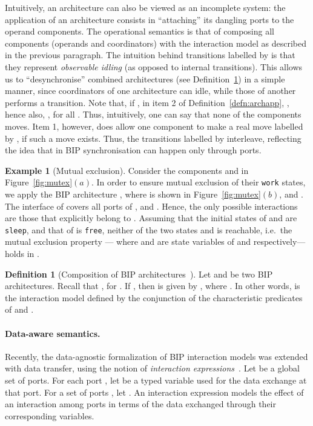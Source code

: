 \documentclass[submission,copyright,creativecommons,hidelinks]{eptcs}
\theoremstyle{plain} \newtheorem{theorem}{Theorem}
\theoremstyle{definition}
\newtheorem{definition}{Definition}
\newtheorem{example}{Example}
\theoremstyle{remark}
\newcommand\xqed[1]{\leavevmode\unskip\penalty9999 \hbox{}\nobreak\hfill
  \quad\hbox{#1}}
\newcommand\tri{\xqed{}}
\newcommand{\mdash}[1][]{---#1}
\newcommand{\ie}[1][\ ]{i.e.{#1}}
\newcommand{\defn}[1]{Definition~\ref{defn:#1}}
\newcommand{\fig}[2][]{Figure~\ref{fig:#2}\ensuremath{#1}}
\begin{document}
Intuitively, an architecture can also be viewed as an incomplete
system: the application of an architecture consists in ``attaching''
its dangling ports to the operand components.  The operational
semantics is that of composing all components (operands and
coordinators) with the interaction model as described in the previous
paragraph.  The intuition behind transitions labelled by 
is that they represent {\em observable idling} (as opposed to internal
transitions).  This allows us to ``desynchronise'' combined
architectures (see \defn{archcomp}) in a simple manner, since
coordinators of one architecture can idle, while those of another 
performs a transition.  Note that, if , in item 2
of \defn{archapp}, , hence also, , for all
.  Thus, intuitively, one can say that none of the components
moves.  Item 1, however, does allow one component to make a real move
labelled by , if such a move exists.  Thus, the transitions
labelled by  interleave, reflecting the idea that in BIP
synchronisation can happen only through ports.

\begin{example}[Mutual exclusion\cite{ABBJS14}]
  \label{ex:mutex:base}
  Consider the components  and  in \fig[(a)]{mutex}.  In order to
  ensure mutual exclusion of their \texttt{work} states, we apply the
  BIP architecture , where 
  is shown in \fig[(b)]{mutex},  and .  
  The interface  of  covers all ports of ,  and
  .  Hence, the only possible interactions are those that explicitly
  belong to .  
  Assuming that the initial states of  and  are \texttt{sleep},
  and that of  is \texttt{free}, neither
  of the two states  and
   is reachable, \ie the
  mutual exclusion property \mdash 
  where  and  are state variables of  and  respectively\mdash holds in  .
\tri\end{example}

\begin{definition}[Composition of BIP architectures~\cite{ABBJS14}]
\label{defn:archcomp}
Let  and  be two BIP architectures.
Recall that , for . 
If , then  is given by , where .
In other words,  is the interaction model defined by the conjunction of the characteristic predicates of  and .
\end{definition}

\paragraph{Data-aware semantics.} Recently, the data-agnostic formalization of BIP interaction models was extended with data transfer, using the notion of \emph{interaction expressions}~\cite{BBJS14}.
Let  be a global set of ports.
For each port , let  be a typed variable used for the data exchange at that port. 
For a set of ports , let .
An interaction expression models the effect of an interaction among ports in terms of the data exchanged through their corresponding variables.
\end{document}
